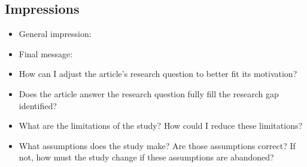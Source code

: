 \subsection{Impressions}

\begin{itemize}
    \item General impression:\cmt{
    \begin{itemize}
        \item 
    \end{itemize}
    }
    
    \item Final message:\cmt{
    \begin{itemize}
        \item 
    \end{itemize}
    }
    
    \item How can I adjust the article's research question to better fit its motivation?\cmt{
    \begin{itemize}
        \item 
    \end{itemize}
    }
    
    \item Does the article answer the research question fully fill the research gap identified?\cmt{
    \begin{itemize}
        \item 
    \end{itemize}
    }
    
    \item What are the limitations of the study? How could I reduce these limitations?\cmt{
    \begin{itemize}
        \item 
    \end{itemize}
    }
    
    \item What assumptions does the study make? Are those assumptions correct? If not, how must the study change if these assumptions are abandoned?\cmt{
    \begin{itemize}
        \item 
    \end{itemize}
    }
    
\end{itemize}

